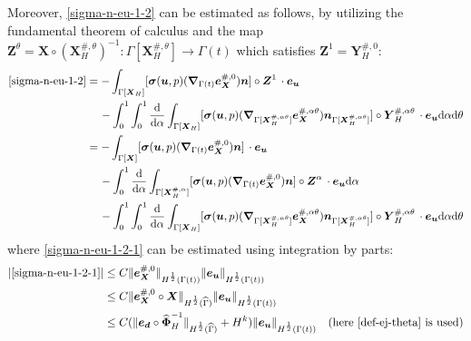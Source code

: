 \documentclass[11pt,reqno]{amsart}
\theoremstyle{definition}
\theoremstyle{plain}
\numberwithin{theorem}{section}
\numberwithin{proposition}{section}
\numberwithin{lemma}{section}
\numberwithin{equation}{section}
\newcommand{\bs}[1]{\boldsymbol{#1}}
\newcommand{\uu}[1]  {{\bs{#1}} }
\newcommand{\grad}   { \uu{\nabla}    }
\def\d{\mathrm{d}}
\newcommand{\bu}{\uu{u}}
\renewcommand{\(}{\bigl(}
\renewcommand{\)}{\bigr)}
\begin{document}
\begin{itemize}[leftmargin=20pt]
Moreover, \eqref{sigma-n-eu-1-2} can be estimated as follows, by utilizing the fundamental theorem of calculus and the map ${\bs Z}^\theta = {\bs X} \circ ({\bs X}_H^{\#,\theta})^{-1}: \Gamma[{\bs X}_H^{\#,\theta}]\rightarrow \Gamma(t)$ which satisfies ${\bs Z}^1=  {\bs Y}_H^{\#,0}$: 
\begin{subequations}\label{sigma-n-eu-1-2-123}
\begin{align}
\eqref{sigma-n-eu-1-2} 
&= -  \int_{\Gamma[\bs X_H]} [{\bs\sigma}(\bu,p)(\grad_{\Gamma(t)} {\bs e}_{\bs X}^{\#,0})  {\bs n} ]\circ {\bs Z}^1 \, \cdot {\bs e}_{\bs u} \notag\\
&\quad\, - \int_0^1 \int_0^1 \frac{\d}{\d\alpha} \int_{\Gamma[\bs X_H]} [{\bs\sigma}(\bu,p)(\grad_{\Gamma[{\bs X}_H^{\#,\alpha\theta}]} {\bs e}_{\bs X}^{\#,\alpha\theta})  {\bs n}_{\Gamma[{\bs X}_H^{\#,\alpha\theta}]} ] \circ {\bs Y}_H^{\#,\alpha\theta}\, \cdot {\bs e}_{\bs u}\d\alpha \d\theta \notag\\
&= - \int_{\Gamma[\bs X]} [{\bs\sigma}(\bu,p)(\grad_{\Gamma(t)} {\bs e}_{\bs X}^{\#,0})  {\bs n} ]\, \cdot {\bs e}_{\bs u} \label{sigma-n-eu-1-2-1} \\
&\quad\, 
- \int_0^1\frac{\d}{\d\alpha}\int_{\Gamma[{\bs X}_H^{\#,\alpha}]} [{\bs\sigma}(\bu,p)(\grad_{\Gamma(t)} {\bs e}_{\bs X}^{\#,0})  {\bs n} ]\circ {\bs Z}^\alpha \, \cdot {\bs e}_{\bs u} \d\alpha 
\label{sigma-n-eu-1-2-2}\\
&\quad\, - \int_0^1 \int_0^1 \frac{\d}{\d\alpha} \int_{\Gamma[\bs X_H]} [{\bs\sigma}(\bu,p)(\grad_{\Gamma[{\bs X}_H^{\#,\alpha\theta}]} {\bs e}_{\bs X}^{\#,\alpha\theta})  {\bs n}_{\Gamma[{\bs X}_H^{\#,\alpha\theta}]} ] \circ {\bs Y}_H^{\#,\alpha\theta}\, \cdot {\bs e}_{\bs u}\d\alpha \d\theta 
\label{sigma-n-eu-1-2-3}
\end{align}
\end{subequations}
where \eqref{sigma-n-eu-1-2-1} can be estimated using integration by parts: 
\begin{align}\label{sigma-n-eu-1-2-1e1}
|\eqref{sigma-n-eu-1-2-1}|
&\le C\|{\bs e}_{\bs X}^{\#,0}\|_{H^{\frac12}(\Gamma(t))}\|{\bs e}_{\bs u}\|_{H^{\frac12}(\Gamma(t))} \notag\\
&\le C\|{\bs e}_{\bs X}^{\#,0} \circ {\bs X}\|_{H^{\frac12}(\widehat\Gamma)}\|{\bs e}_{\bs u}\|_{H^{\frac12}(\Gamma(t))} \notag\\
&\le C(\|{\bs e}_{\bs d}\circ\widehat{\bs\Phi}_H^{-1}\|_{H^{\frac12}(\widehat\Gamma)} + H^k)\|{\bs e}_{\bs u}\|_{H^{\frac12}(\Gamma(t))} 
\quad\mbox{(here \eqref{def-ej-theta} is used)} \notag\\

\end{align}
\end{itemize}
\end{document}
